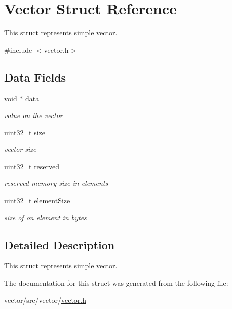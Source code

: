 \hypertarget{structVector}{}\section{Vector Struct Reference}
\label{structVector}


This struct represents simple vector.  




{\ttfamily \#include $<$vector.\+h$>$}

\subsection*{Data Fields}
\begin{DoxyCompactItemize}
\item 
\mbox{\label{structVector_abc10ac30895378eed4f5b07edfdaaf62}} 
void $\ast$ \hyperlink{structVector_abc10ac30895378eed4f5b07edfdaaf62}{data}
\begin{DoxyCompactList}\small\item\em value on the vector \end{DoxyCompactList}\item 
\mbox{\label{structVector_a05d98988b273ccb33a96524d5591eb77}} 
uint32\+\_\+t \hyperlink{structVector_a05d98988b273ccb33a96524d5591eb77}{size}
\begin{DoxyCompactList}\small\item\em vector size \end{DoxyCompactList}\item 
\mbox{\label{structVector_a94aac82cd99201901a1fd8e32cbdb1b0}} 
uint32\+\_\+t \hyperlink{structVector_a94aac82cd99201901a1fd8e32cbdb1b0}{reserved}
\begin{DoxyCompactList}\small\item\em reserved memory size in elements \end{DoxyCompactList}\item 
\mbox{\label{structVector_a13a97a989dd4e8e160d553182fd30f32}} 
uint32\+\_\+t \hyperlink{structVector_a13a97a989dd4e8e160d553182fd30f32}{element\+Size}
\begin{DoxyCompactList}\small\item\em size of on element in bytes \end{DoxyCompactList}\end{DoxyCompactItemize}


\subsection{Detailed Description}
This struct represents simple vector. 

The documentation for this struct was generated from the following file\+:\begin{DoxyCompactItemize}
\item 
vector/src/vector/\hyperlink{vector_8h}{vector.\+h}\end{DoxyCompactItemize}
